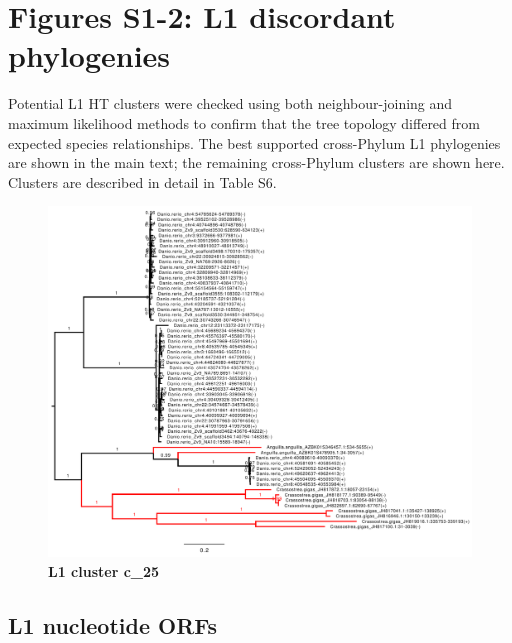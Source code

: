 \documentclass[12pt,a4paper,times]{article}
\newcommand{\beginsupplement}{%
	\setcounter{table}{0}
	\renewcommand{\thetable}{S\arabic{table}}%
	\setcounter{figure}{0}
	\renewcommand{\thefigure}{S\arabic{figure}}%
}
\begin{document}
	
\beginsupplement
	\tableofcontents
	
	\newpage 


\section*{Figures S1-2: L1 discordant phylogenies}
Potential L1 HT clusters were checked using both neighbour-joining and maximum likelihood methods to confirm  that the tree topology differed from expected species relationships. 
The best supported cross-Phylum L1 phylogenies are shown in the main text; the remaining cross-Phylum clusters are shown here. 
Clusters are described in detail in Table S6.

\begin{figure}[H]
	\centering
	\includegraphics[scale=0.65]{suppFigures/clusters/c_25.pdf}
	\caption{\footnotesize \textbf{L1 cluster c\_25} \label{L1fam25}}
\end{figure}

\subsection*{L1 nucleotide ORFs}
\end{document}
